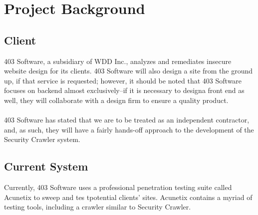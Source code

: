 \section{Project Background}
\subsection{Client}
	403 Software, a subsidiary of WDD Inc., analyzes and remediates insecure website design for its clients.  403 Software will also design a site from the ground up, if that service is requested; however, it should be noted that 403 Software focuses on backend almost exclusively--if it is necessary to designa  front end as well, they will collaborate with a design firm to ensure a quality product. \\\\
403 Software has stated that we are to be treated as an independent contractor, and, as such, they will have a fairly hands-off approach to the development of the Security Crawler system.

\subsection{Current System}

	Currently, 403 Software uses a professional penetration testing suite called Acunetix to sweep and tes tpotential clients' sites.  Acunetix contains a myriad of testing tools, including a crawler similar to Security Crawler.

